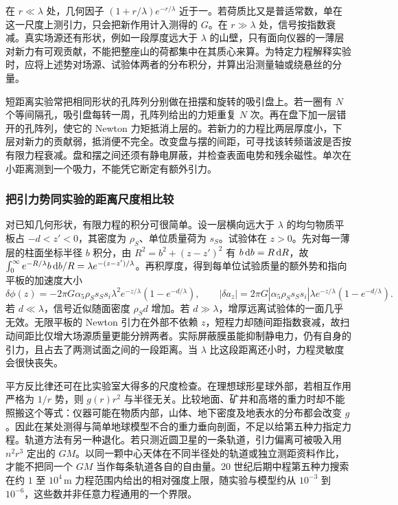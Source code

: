 在 $r\ll\lambda$ 处，几何因子 $(1+r/\lambda)e^{-r/\lambda}$ 近于一。若荷质比又是普适常数，单在这一尺度上测引力，只会把新作用计入测得的 $G$。在 $r\gg\lambda$ 处，信号按指数衰减。真实场源还有形状，例如一段厚度远大于 $\lambda$ 的山壁，只有面向仪器的一薄层对新力有可观贡献，不能把整座山的荷都集中在其质心来算。为特定力程解释实验时，应将上述势对场源、试验体两者的分布积分，并算出沿测量轴或绕悬丝的分量。

短距离实验常把相同形状的孔阵列分别做在扭摆和旋转的吸引盘上。若一圈有 $N$ 个等间隔孔，吸引盘每转一周，孔阵列给出的力矩重复 $N$ 次。再在盘下加一层错开的孔阵列，使它的 Newton 力矩抵消上层的。若新力的力程比两层厚度小，下层对新力的贡献弱，抵消便不完全。改变盘与摆的间距，可寻找该转频谐波是否按有限力程衰减。盘和摆之间还须有静电屏蔽，并检查表面电势和残余磁性。单次在小距离测到一个吸力，不能凭它断定有额外引力。

\subsubsection{把引力势同实验的距离尺度相比较}

对已知几何形状，有限力程的积分可很简单。设一层横向远大于 $\lambda$ 的均匀物质平板占 $-d<z'<0$，其密度为 $\rho_S$、单位质量荷为 $s_S$。试验体在 $z>0$。先对每一薄层的柱面坐标半径 $b$ 积分，由 $R^2=b^2+(z-z')^2$ 有 $b\,\dd b=R\,\dd R$，故 $\int_0^\infty e^{-R/\lambda}b\,\dd b/R=\lambda e^{-(z-z')/\lambda}$。再积厚度，得到每单位试验质量的额外势和指向平板的加速度大小
\[
 \delta\phi(z)=-2\pi G\alpha_5\rho_S s_Ss_i\lambda^2
     e^{-z/\lambda}(1-e^{-d/\lambda}),\qquad
 |\delta a_z|=2\pi G|\alpha_5\rho_S s_Ss_i|\lambda
     e^{-z/\lambda}(1-e^{-d/\lambda}).
\]
若 $d\ll\lambda$，信号近似随面密度 $\rho_Sd$ 增加。若 $d\gg\lambda$，增厚远离试验体的一面几乎无效。无限平板的 Newton 引力在外部不依赖 $z$，短程力却随间距指数衰减，故扫动间距比仅增大场源质量更能分辨两者。实际屏蔽膜虽能抑制静电力，仍有自身的引力，且占去了两测试面之间的一段距离。当 $\lambda$ 比这段距离还小时，力程灵敏度会很快丧失。

平方反比律还可在比实验室大得多的尺度检查。在理想球形星球外部，若相互作用严格为 $1/r$ 势，则 $g(r)r^2$ 与半径无关。比较地面、矿井和高塔的重力时却不能照搬这个等式：仪器可能在物质内部，山体、地下密度及地表水的分布都会改变 $g$。因此在某处测得与简单地球模型不合的重力垂向剖面，不足以给第五种力指定力程。轨道方法有另一种退化。若只测近圆卫星的一条轨道，引力偏离可被吸入用 $n^2r^3$ 定出的 $GM$。以同一颗中心天体在不同半径处的轨道或独立测距资料作比，才能不把同一个 $GM$ 当作每条轨道各自的自由量。20 世纪后期中程第五种力搜索在约 $1$ 至 $10^4\,\mathrm m$ 力程范围内给出的相对强度上限，随实验与模型约从 $10^{-3}$ 到 $10^{-6}$，这些数并非任意力程通用的一个界限。


